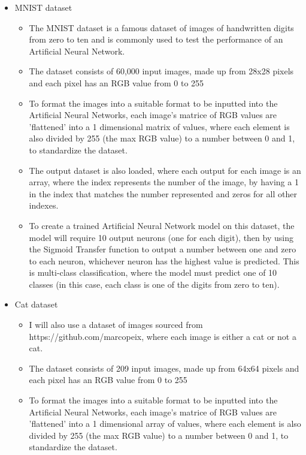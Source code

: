 \documentclass[./project-report/src/latex/project-report.tex]{subfiles}
\begin{document}
\begin{itemize}
    \item MNIST dataset
    \begin{itemize}
        \item The MNIST dataset is a famous dataset of images of handwritten digits from zero to ten and is commonly used to test the performance of an Artificial 
              Neural Network.
        \item The dataset consists of 60,000 input images, made up from 28x28 pixels and each pixel has an RGB value from 0 to 255
        \item To format the images into a suitable format to be inputted into the Artificial Neural Networks, each image's matrice of RGB values are 'flattened' into a 
              1 dimensional matrix of values, where each element is also divided by 255 (the max RGB value) to a number between 0 and 1, to standardize the dataset.
        \item The output dataset is also loaded, where each output for each image is an array, where the index represents the number of the image, by having a 1 in the 
              index that matches the number represented and zeros for all other indexes.
        \item To create a trained Artificial Neural Network model on this dataset, the model will require 10 output neurons (one for each digit), then by using the 
              Sigmoid Transfer function to output a number between one and zero to each neuron, whichever neuron has the highest value is predicted. This is multi-class 
              classification, where the model must predict one of 10 classes (in this case, each class is one of the digits from zero to ten).
    \end{itemize}
    \item Cat dataset
    \begin{itemize}
        \item I will also use a dataset of images sourced from https://github.com/marcopeix, where each image is either a cat or not a cat.
        \item The dataset consists of 209 input images, made up from 64x64 pixels and each pixel has an RGB value from 0 to 255
        \item To format the images into a suitable format to be inputted into the Artificial Neural Networks, each image's matrice of RGB values are 'flattened' into a 
              1 dimensional array of values, where each element is also divided by 255 (the max RGB value) to a number between 0 and 1, to standardize the dataset.

\end{itemize}
\end{itemize}
\end{document}
